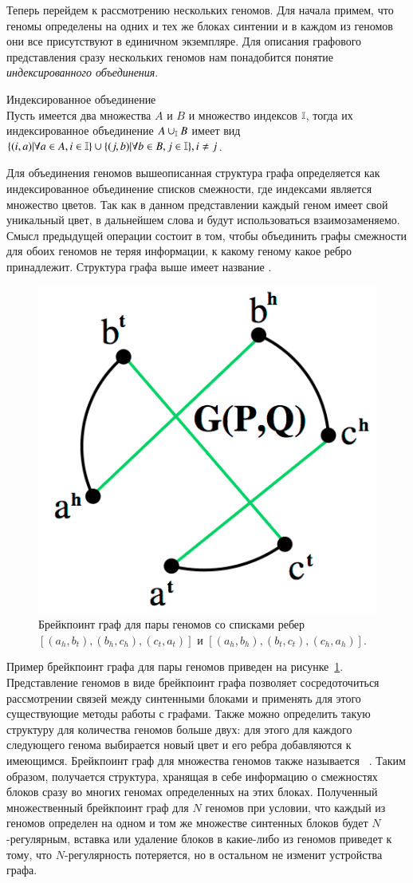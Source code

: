 Теперь перейдем к рассмотрению нескольких геномов.
Для начала примем, что геномы определены на одних и тех же блоках синтении и в каждом из геномов они все присутствуют в единичном экземпляре.
Для описания графового представления сразу нескольких геномов нам понадобится понятие \textit{индексированного объединения}.
\begin{define}{Индексированное объединение} \\
  Пусть имеется два множества $A$ и $B$ и множество индексов $\mathbb{I}$, тогда их индексированное объединение
  $A \cup_{\mathbb{I}} B$ имеет вид $\{ (i, a) | \forall a \in A, i \in \mathbb{I}\} \cup \{ (j, b) | \forall b \in B, j \in \mathbb{I}\}, i \neq j$.
\end{define}
Для объединения геномов вышеописанная структура графа определяется как индексированное объединение списков смежности, где индексами является множество цветов.
Так как в данном представлении каждый геном имеет свой уникальный цвет, в дальнейшем слова  и  будут использоваться взаимозаменяемо.
Смысл предыдущей операции состоит в том, чтобы объединить графы смежности для обоих геномов не теряя информации, к какому геному какое ребро принадлежит.
Структура графа выше имеет название .
\begin{figure}[H]
  \centering
  \includegraphics[max width=0.5\linewidth]{fig/1/two_genomes_bp_graph.png}
  \caption{Брейкпоинт граф для пары геномов со списками ребер $[(a_h, b_t), (b_h, c_h), (c_t, a_t)]$ и $[(a_h, b_h), (b_t, c_t), (c_h, a_h)]$.}
  \label{fig:two_genomes_bp_graph}
\end{figure}
Пример брейкпоинт графа для пары геномов приведен на рисунке~\ref{fig:two_genomes_bp_graph}.
Представление геномов в виде брейкпоинт графа позволяет сосредоточиться рассмотрении связей между синтенными блоками
и применять для этого существующие методы работы с графами.
Также можно определить такую структуру для количества геномов больше двух:
для этого для каждого следующего генома выбирается новый цвет и его ребра добавляются к имеющимся.
Брейкпоинт граф для множества геномов также называется ~\cite{caprara1999tightness}.
Таким образом, получается структура, хранящая в себе информацию о смежностях блоков сразу во многих геномах определенных на этих блоках.
Полученный множественный брейкпоинт граф для $N$ геномов при условии, что каждый из геномов определен на одном и том же множестве синтенных блоков
будет $N$-регулярным, вставка или удаление блоков в какие-либо из геномов приведет к тому, что $N$-регулярность потеряется,
но в остальном не изменит устройства графа.

